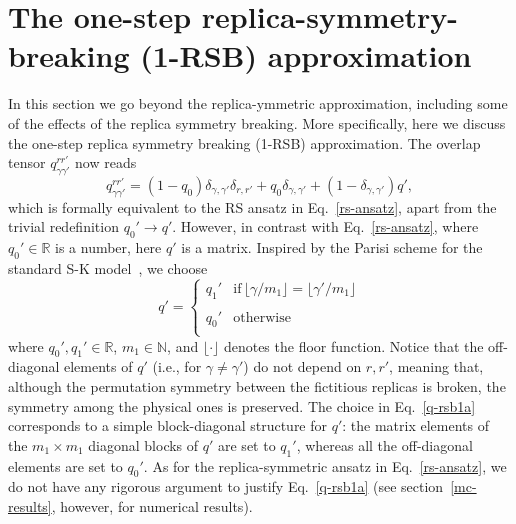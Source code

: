 \documentclass[twocolumn,superscriptaddress,prb,10pt]{revtex4-1}
\begin{document}
\section{The one-step replica-symmetry-breaking (1-RSB) approximation}
\label{rsb-1-section}

In this section we go beyond the replica-ymmetric approximation, including some 
of the effects of the replica symmetry breaking. More specifically, 
here we discuss the one-step replica symmetry breaking (1-RSB) approximation. 
The overlap tensor $q_{\gamma\gamma'}^{rr'}$ now reads  
%
\begin{equation}
\label{q-rsb1}
q_{\gamma\gamma'}^{rr'}=(1-q_0)\delta_{\gamma,\gamma'}\delta_{r,r'} +
q_0\delta_{\gamma,\gamma'}+(1-\delta_{\gamma,\gamma'})q', 
\end{equation}
%
which is formally equivalent to the RS ansatz in Eq.~\eqref{rs-ansatz}, apart from 
the trivial redefinition $q_0'\to q'$. However, in contrast with Eq.~\eqref{rs-ansatz}, 
where $q_0'\in\mathbb{R}$ is a number, here $q'$ is a matrix. Inspired by the Parisi 
scheme for the standard S-K model~\cite{parisi-1979}, we choose 
%
\begin{equation}
q'=\left\{
\begin{array}{cc}
q_1' & \textrm{if}\, \lfloor\gamma/m_1\rfloor=\lfloor\gamma'/m_1\rfloor\\\\
q_0' & \textrm{otherwise}\\
\end{array}
\right.
\label{q-rsb1a}
\end{equation}
%
where $q_0',q_1'\in{\mathbb R}$, $m_1\in{\mathbb N}$, and $\lfloor\cdot\rfloor$ 
denotes the floor function. Notice that the off-diagonal elements of $q'$ (i.e., for 
$\gamma\ne\gamma'$) do not depend on $r,r'$, meaning that, although the permutation 
symmetry between the fictitious replicas is broken, the symmetry among the physical ones 
is preserved. The choice in Eq.~\eqref{q-rsb1a} corresponds to a simple block-diagonal 
structure for $q'$: the matrix elements of the $m_1\times m_1$ diagonal blocks of $q'$ 
are set to $q_1'$, whereas all the off-diagonal elements are set to $q_0'$. As for the 
replica-symmetric ansatz in Eq.~\eqref{rs-ansatz}, we do not have any rigorous argument 
to justify Eq.~\eqref{q-rsb1a} (see section~\eqref{mc-results}, however, for numerical 
results).
\end{document}
